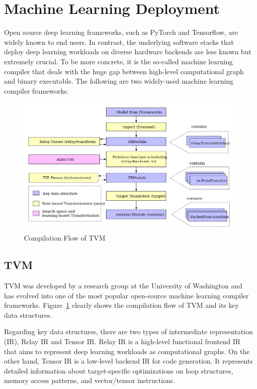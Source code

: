 \section{Machine Learning Deployment}
Open source deep learning frameworks, such as PyTorch and Tensorflow, are widely known to end users. In contrast, the underlying software stacks that deploy deep learning workloads on diverse hardware backends are less known but extremely crucial. To be more concrete, it is the so-called machine learning compiler that deals with the huge gap between high-level computational graph and binary executable. The following are two widely-used machine learning compiler frameworks.

\begin{figure}
    \centering
    \includegraphics[width=1\linewidth]{figures/TVM_compilation_flow.png}
    \caption{Compilation Flow of TVM}
    \label{fig:tvm_compilation_flow}
\end{figure}

\subsection{TVM}
TVM was developed by a research group at the University of Washington and has evolved into one of the most popular open-source machine learning compiler frameworks. Figure~\ref{fig:tvm_compilation_flow} clearly shows the compilation flow of TVM and its key data structures.

Regarding key data structures, there are two types of intermediate representation (IR), Relay IR and Tensor IR. Relay IR is a high-level functional frontend IR that aims to represent deep learning workloads as computational graphs. On the other hand, Tensor IR is a low-level backend IR for code generation. It represents detailed information about target-specific optimizations on loop structures, memory access patterns, and vector/tensor instructions.

